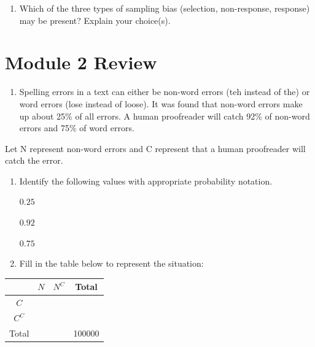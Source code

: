 \documentclass[
]{report}
\providecommand{\tightlist}{%
  \setlength{\itemsep}{0pt}\setlength{\parskip}{0pt}}
\begin{document}
\vspace{0.4in}

\begin{enumerate}
\def\labelenumi{\alph{enumi}.}
\setcounter{enumi}{2}
\tightlist
\item
  Which of the three types of sampling bias (selection, non-response, response) may be present? Explain your choice(s).
\end{enumerate}

\newpage

\section{Module 2 Review}\label{module-2-review}

\begin{enumerate}
\def\labelenumi{\arabic{enumi}.}
\tightlist
\item
  Spelling errors in a text can either be non-word errors (teh instead of the) or word errors (lose instead of loose). It was found that non-word errors make up about 25\% of all errors. A human proofreader will catch 92\% of non-word errors and 75\% of word errors.
\end{enumerate}

Let N represent non-word errors and C represent that a human proofreader will catch the error.

\begin{enumerate}
\def\labelenumi{\alph{enumi}.}
\item
  Identify the following values with appropriate probability notation.
  \vspace{2mm}

  \(0.25\)
  \vspace{2mm}

  \(0.92\)
  \vspace{2mm}

  \(0.75\)
  \vspace{2mm}
\item
  Fill in the table below to represent the situation:
\end{enumerate}

\begin{center}
\begin{tabular}{|c|c|c|c|} \hline
\hspace{0.8in} & \hspace{0.25in}  $N$ \hspace{.25in} & \hspace{0.25in} $N^C$ \hspace{0.25in} & \hspace{0.25in} Total \hspace{0.25in} \\ \hline
 $C$ &  &  &  \\ \hline
 $C^C$ &  & &  \\ \hline
Total &  &  & 100000 \\ \hline
\end{tabular}
\end{center}
\vspace{.1in}
\end{document}
